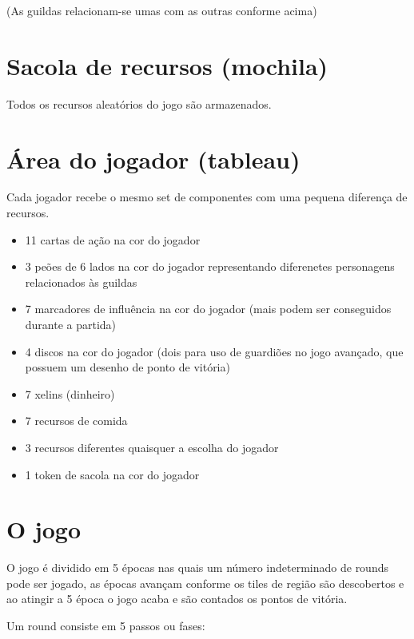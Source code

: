 \documentclass[11pt]{article}
\begin{document}
(As guildas relacionam-se umas com as outras conforme acima)

\section{Sacola de recursos (mochila)}
\label{sec-3}

Todos os recursos aleatórios do jogo são armazenados.

\section{Área do jogador (tableau)}
\label{sec-4}

Cada jogador recebe o mesmo set de componentes com uma pequena diferença de recursos.

\begin{itemize}
\item 11 cartas de ação na cor do jogador
\item 3 peões de 6 lados na cor do jogador representando diferenetes personagens relacionados às guildas
\item 7 marcadores de influência na cor do jogador (mais podem ser conseguidos durante a partida)
\item 4 discos na cor do jogador (dois para uso de guardiões no jogo avançado, que possuem um desenho de ponto de vitória)
\item 7 xelins (dinheiro)
\item 7 recursos de comida
\item 3 recursos diferentes quaisquer a escolha do jogador
\item 1 token de sacola na cor do jogador
\end{itemize}

\section{O jogo}
\label{sec-5}

O jogo é dividido em 5 épocas nas quais um número indeterminado de rounds pode ser jogado, as épocas avançam conforme os tiles de região são descobertos e ao atingir a 5 época o jogo acaba e são contados os pontos de vitória.


Um round consiste em 5 passos ou fases:
\end{document}

